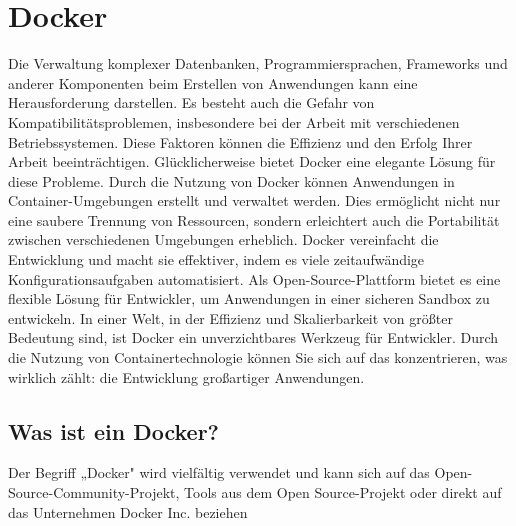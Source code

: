 \section{Docker}\label{Docker}

Die Verwaltung komplexer Datenbanken, Programmiersprachen, Frameworks und anderer Komponenten beim Erstellen von Anwendungen kann eine Herausforderung darstellen. Es besteht auch die Gefahr von Kompatibilitätsproblemen, insbesondere bei der Arbeit mit verschiedenen Betriebssystemen. Diese Faktoren können die Effizienz und den Erfolg Ihrer Arbeit beeinträchtigen.
Glücklicherweise bietet Docker eine elegante Lösung für diese Probleme. Durch die Nutzung von Docker können Anwendungen in Container-Umgebungen erstellt und verwaltet werden. Dies ermöglicht nicht nur eine saubere Trennung von Ressourcen, sondern erleichtert auch die Portabilität zwischen verschiedenen Umgebungen erheblich.
Docker vereinfacht die Entwicklung und macht sie effektiver, indem es viele zeitaufwändige Konfigurationsaufgaben automatisiert. Als Open-Source-Plattform bietet es eine flexible Lösung für Entwickler, um Anwendungen in einer sicheren Sandbox zu entwickeln.
In einer Welt, in der Effizienz und Skalierbarkeit von größter Bedeutung sind, ist Docker ein unverzichtbares Werkzeug für Entwickler. Durch die Nutzung von Containertechnologie können Sie sich auf das konzentrieren, was wirklich zählt: die Entwicklung großartiger Anwendungen.

\subsection{Was ist ein Docker?}

Der Begriff „Docker" wird vielfältig verwendet und kann sich auf das Open-Source-Community-Projekt, Tools aus dem Open Source-Projekt oder direkt auf das Unternehmen Docker Inc. beziehen





